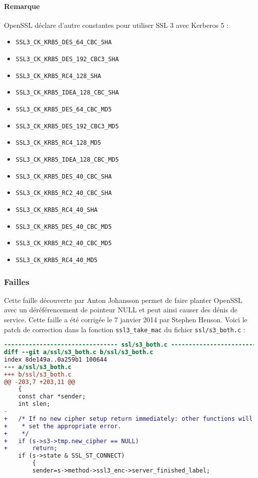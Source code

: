 \paragraph{Remarque} OpenSSL déclare d'autre constantes pour utiliser SSL 3 avec Kerberos 5 :
\begin{itemize}
\item \verb+SSL3_CK_KRB5_DES_64_CBC_SHA+
\item \verb+SSL3_CK_KRB5_DES_192_CBC3_SHA+
\item \verb+SSL3_CK_KRB5_RC4_128_SHA+
\item \verb+SSL3_CK_KRB5_IDEA_128_CBC_SHA+
\item \verb+SSL3_CK_KRB5_DES_64_CBC_MD5+
\item \verb+SSL3_CK_KRB5_DES_192_CBC3_MD5+
\item \verb+SSL3_CK_KRB5_RC4_128_MD5+
\item \verb+SSL3_CK_KRB5_IDEA_128_CBC_MD5+
\item \verb+SSL3_CK_KRB5_DES_40_CBC_SHA+
\item \verb+SSL3_CK_KRB5_RC2_40_CBC_SHA+
\item \verb+SSL3_CK_KRB5_RC4_40_SHA+
\item \verb+SSL3_CK_KRB5_DES_40_CBC_MD5+
\item \verb+SSL3_CK_KRB5_RC2_40_CBC_MD5+
\item \verb+SSL3_CK_KRB5_RC4_40_MD5+
\end{itemize}


\subsubsection{Failles}
\setcounter{subsubsubsection}{0}
Cette faille découverte par Anton Johansson \cite{CVE20134353} permet de faire planter OpenSSL avec un déréférencement de pointeur NULL et peut ainsi causer des dénis de service. Cette faille a été corrigée le 7 janvier 2014 par Stephen Henson. Voici le patch de correction dans la fonction \verb+ssl3_take_mac+ du fichier \verb+ssl/s3_both.c+ :

\begin{lstlisting}[language=diff,caption=patch-cve-2013-4353, label=patch-cve-2013-4353]
-------------------------------- ssl/s3_both.c --------------------------------
diff --git a/ssl/s3_both.c b/ssl/s3_both.c
index 8de149a..0a259b1 100644
--- a/ssl/s3_both.c
+++ b/ssl/s3_both.c
@@ -203,7 +203,11 @@
 	{
 	const char *sender;
 	int slen;
-
+	/* If no new cipher setup return immediately: other functions will
+	 * set the appropriate error.
+	 */
+	if (s->s3->tmp.new_cipher == NULL)
+		return;
 	if (s->state & SSL_ST_CONNECT)
 		{
 		sender=s->method->ssl3_enc->server_finished_label;
\end{lstlisting}


